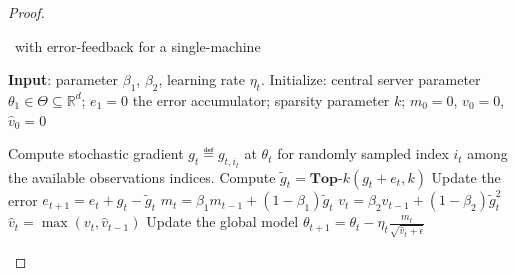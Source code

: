 \documentclass[11pt]{article}
\begin{document}
\begin{proof}
\begin{algorithm}[H]
\caption{\algo\ with error-feedback for a single-machine} \label{alg:sparsamssingle}
\begin{algorithmic}[1]

\STATE \textbf{Input}: parameter $\beta_1$, $\beta_2$, learning rate $\eta_t$. 
\STATE Initialize: central server parameter $\theta_{1} \in \Theta \subseteq \mathbb R^d$; $e_{1}=0$ the error accumulator; sparsity parameter $k$; $m_0=0$, $v_0=0$, $\hat v_0=0$

\STATE  Compute stochastic gradient $g_{t} \eqdef g_{t,i_t}$ at $\theta_t$ for randomly sampled index $i_t$ among the available observations indices. \label{line:stochgrad} 
\STATE  Compute $\tilde g_{t}=\textbf{Top-$k$}(g_{t}+e_{t},k)$ \label{line:topksingle} 
\STATE  Update the error $e_{t+1}=e_{t}+g_{t}-\tilde g_{t}$
\STATE $m_t=\beta_1 m_{t-1}+(1-\beta_1)\tilde g_t$
\STATE $v_t=\beta_2 v_{t-1}+(1-\beta_2)\tilde g_t^2$
\STATE $\hat v_t=\max(v_t,\hat v_{t-1})$ \label{line:vsingle}
\STATE Update the global model $\theta_{t+1}=\theta_{t}-\eta_t\frac{m_t}{\sqrt{\hat v_t+\epsilon}}$

\ENDFOR
\end{algorithmic}
\end{algorithm}



\end{proof}
\end{document}
